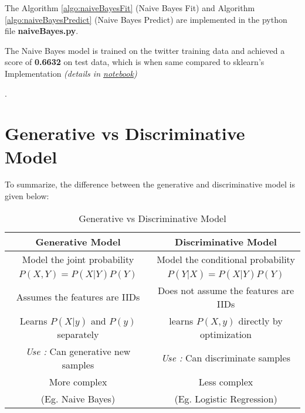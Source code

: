{The Algorithm \ref{algo:naiveBayesFit} (Naive Bayes Fit) and Algorithm \ref{algo:naiveBayesPredict} (Naive Bayes Predict) are implemented in the python file {\bf naiveBayes.py}.

The Naive Bayes model is trained on the twitter training data and achieved a score of {\bf 0.6632} on test data, which is when same compared to sklearn's Implementation {\it (details in \href{https://github.com/Mahanth-Maha/NLP-DS207/blob/main/notes/lec01/lec_01_TextClassification.ipynb}{notebook}) }}.


\section{Generative vs Discriminative Model}

To summarize, the difference between the generative and discriminative model is given below:

\begin{table}[h]
	\centering
	\begin{tabular}{|c|c|}
		\hline
		\textbf{Generative Model} & \textbf{Discriminative Model} \\
		\hline
		Model the joint probability & Model the conditional probability \\
		$P(X,Y) = P(X|Y)P(Y)$ & $P(Y|X) = P(X|Y)P(Y)$ \\
		\hline
		Assumes the features are IIDs & Does not assume the features are IIDs \\
		\hline
		Learns $P(X|y)$ and $P(y)$ separately & learns $P(X,y)$ directly by optimization \\
		\hline
		{\it Use : } Can generative new samples & {\it Use : } Can discriminate samples \\
		\hline
		More complex  & Less complex \\
		(Eg. Naive Bayes) & (Eg. Logistic Regression) \\
		\hline
	\end{tabular}
	\caption{Generative vs Discriminative Model}
\end{table}



